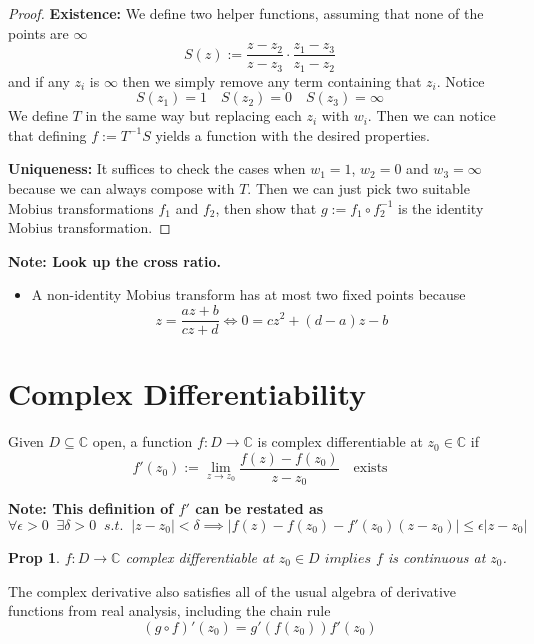 \documentclass[11pt]{article}
\newcommand{\defeq}{:=}
\newcommand{\abs}[1]{|#1|}
\newcommand{\C}{\mathbb{C}}
\newenvironment{defin}
	{\begin{mdframed}[backgroundcolor=white, roundcorner=5pt, linewidth=1pt]}
	{\end{mdframed}}
\newcommand{\mdf}[1]{{\color{red} #1}}
\newenvironment{note}
	{\begin{mdframed}[backgroundcolor=white, linecolor=red, roundcorner=5pt, linewidth=1pt]\bfseries{Note:}\normalfont}
	{\end{mdframed}}
\newtheorem{prop}[theorem]{Prop}
\begin{document}
\begin{proof}
\textbf{Existence: }
We define two helper functions, assuming that none of the points are $\infty$
\[
	S(z)\defeq\frac{z-z_2}{z-z_3}\cdot\frac{z_1-z_3}{z_1-z_2}
\]
and if any $z_i$ is $\infty$ then we simply remove any term containing that $z_i$.
Notice
\[
	S(z_1) = 1 \quad S(z_2) = 0 \quad S(z_3) = \infty
\]
We define $T$ in the same way but replacing each $z_i$ with $w_i$.
Then we can notice that defining $f\defeq T^{-1}S$ yields a function with the desired properties.

\textbf{Uniqueness: }
It suffices to check the cases when $w_1=1$, $w_2=0$ and $w_3=\infty$ because we can always compose with $T$.
Then we can just pick two suitable Mobius transformations $f_1$ and $f_2$, then show that $g\defeq f_1\circ f_2^{-1}$ is the identity Mobius transformation.
\end{proof}

\begin{note}
Look up the cross ratio.
\begin{itemize}
	\item A non-identity Mobius transform has at most two fixed points because
		\[
			z=\frac{az+b}{cz+d}\iff 0 =cz^2 + (d-a)z -b
		\]
\end{itemize}
\end{note}

\section{Complex Differentiability}

\begin{defin}
	Given $D\subseteq \C$ open, a function $f:D\to \C$ is \mdf{complex differentiable at $z_0\in\C$} if
	\[
		f'(z_0)\defeq\lim_{z\to z_0}\frac{f(z)-f(z_0)}{z-z_0}\quad\text{exists}
	\]
\end{defin}

\begin{note}
This definition of $f'$ can be restated as 
\[
	\forall \epsilon >0 \;\; \exists\delta >0 \;\; s.t. \;\; \abs{z- z_0} < \delta \implies \abs{f(z)-f(z_0)- f'(z_0)(z- z_0)} \leq \epsilon \abs{z- z_0}
\]
\end{note}

\begin{prop}
$f:D\to\C$ complex differentiable at $z_0\in D$ $implies$ $f$ is continuous at $z_0$.
\end{prop}

The complex derivative also satisfies all of the usual algebra of derivative functions from real analysis, including the chain rule
\[
	(g\circ f)'(z_0) = g'(f(z_0))f'(z_0)
\]
\end{document}
